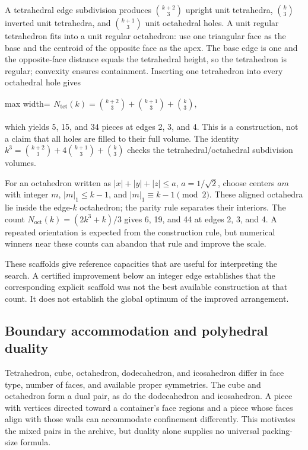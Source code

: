 \documentclass[11pt,a4paper]{article}
\begin{document}
A tetrahedral edge subdivision produces $\binom{k+2}{3}$ upright unit tetrahedra, $\binom{k}{3}$ inverted unit tetrahedra, and $\binom{k+1}{3}$ unit octahedral holes. A unit regular tetrahedron fits into a unit regular octahedron: use one triangular face as the base and the centroid of the opposite face as the apex. The base edge is one and the opposite-face distance equals the tetrahedral height, so the tetrahedron is regular; convexity ensures containment. Inserting one tetrahedron into every octahedral hole gives

\begin{center}\begin{adjustbox}{max width=\linewidth}$\displaystyle\begin{aligned}
N_{\mathrm{tet}}(k)=\binom{k+2}{3}+\binom{k+1}{3}+\binom{k}{3},
\end{aligned}$\end{adjustbox}\end{center}

which yields 5, 15, and 34 pieces at edges 2, 3, and 4. This is a construction, not a claim that all holes are filled to their full volume. The identity $k^3=\binom{k+2}{3}+4\binom{k+1}{3}+\binom{k}{3}$ checks the tetrahedral/octahedral subdivision volumes.

For an octahedron written as $|x|+|y|+|z|\le a$, $a=1/\sqrt2$, choose centers $a m$ with integer $m$, $|m|_1\le k-1$, and $|m|_1\equiv k-1\pmod2$. These aligned octahedra lie inside the edge-$k$ octahedron; the parity rule separates their interiors. The count $N_{\mathrm{oct}}(k)=(2k^3+k)/3$ gives 6, 19, and 44 at edges 2, 3, and 4. A repeated orientation is expected from the construction rule, but numerical winners near these counts can abandon that rule and improve the scale.

These scaffolds give reference capacities that are useful for interpreting the search. A certified improvement below an integer edge establishes that the corresponding explicit scaffold was not the best available construction at that count. It does not establish the global optimum of the improved arrangement.

\subsection{Boundary accommodation and polyhedral duality}

Tetrahedron, cube, octahedron, dodecahedron, and icosahedron differ in face type, number of faces, and available proper symmetries. The cube and octahedron form a dual pair, as do the dodecahedron and icosahedron. A piece with vertices directed toward a container's face regions and a piece whose faces align with those walls can accommodate confinement differently. This motivates the mixed pairs in the archive, but duality alone supplies no universal packing-size formula.
\end{document}
